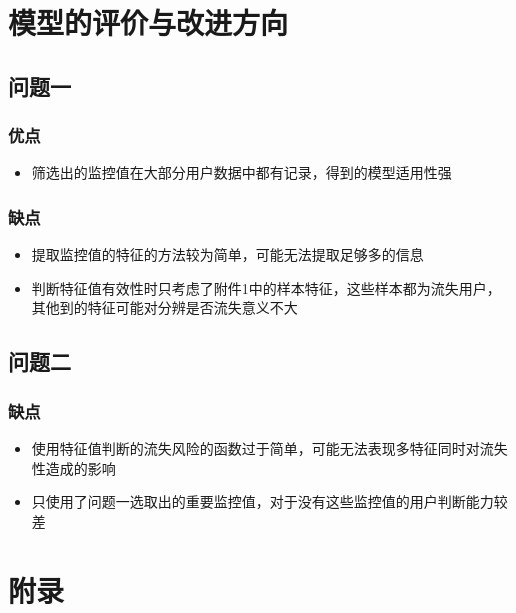 \documentclass{ctexart}
\begin{document}
        \section{模型的评价与改进方向}
        \subsection{问题一}
			\subsubsection{优点}
				\begin{itemize}
					\item 筛选出的监控值在大部分用户数据中都有记录，得到的模型适用性强
				\end{itemize}
            \subsubsection{缺点}
                \begin{itemize}
                    \item 提取监控值的特征的方法较为简单，可能无法提取足够多的信息
                    \item 判断特征值有效性时只考虑了附件1中的样本特征，这些样本都为流失用户，其他到的特征可能对分辨是否流失意义不大
            	\end{itemize}
			\subsection{问题二}
				\subsubsection{缺点}
					\begin{itemize}
						\item 使用特征值判断的流失风险的函数过于简单，可能无法表现多特征同时对流失性造成的影响
						\item 只使用了问题一选取出的重要监控值，对于没有这些监控值的用户判断能力较差
					\end{itemize}
        

    \section{附录}
\end{document}
